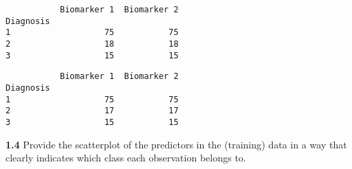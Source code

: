 \documentclass[11pt]{article}
\begin{document}
    
    \begin{verbatim}
           Biomarker 1  Biomarker 2
Diagnosis                          
1                   75           75
2                   18           18
3                   15           15
    \end{verbatim}

    
    
    \begin{verbatim}
           Biomarker 1  Biomarker 2
Diagnosis                          
1                   75           75
2                   17           17
3                   15           15
    \end{verbatim}

    
    \textbf{1.4} Provide the scatterplot of the predictors in the (training)
data in a way that clearly indicates which class each observation
belongs to.
\end{document}
